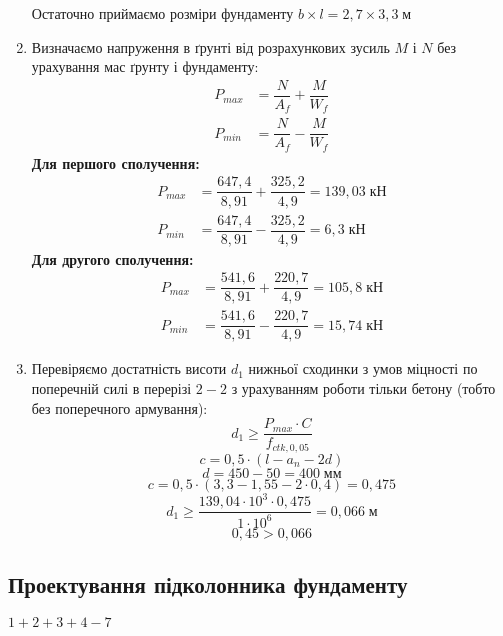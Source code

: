 \documentclass[a4paper,14pt]{article}
\begin{document}
\begin{enumerate}
\begin{equation*}
        \end{equation*}
    Остаточно приймаємо розміри фундаменту $b \times l = 2,7 \times 3,3\;\textit{м}$    
    \item Визначаємо напруження в ґрунті від розрахункових зусиль $M$ і $N$ без урахування мас ґрунту і фундаменту:
        \begin{equation}
        \begin{aligned}
            P_{max} &= \dfrac{N}{A_f} + \dfrac{M}{W_f}\\
            P_{min} &= \dfrac{N}{A_f} - \dfrac{M}{W_f}           
        \end{aligned}
        \end{equation}
        \textbf{Для першого сполучення:}
    \begin{equation*}
        \begin{aligned}
            P_{max} &= \dfrac{647,4}{8,91} + \dfrac{325,2}{4,9} = 139,03\;\textit{кН}\\
            P_{min} &= \dfrac{647,4}{8,91} - \dfrac{325,2}{4,9} = 6,3\;\textit{кН} 
        \end{aligned}
        \end{equation*}
    \textbf{Для другого сполучення:}
    \begin{equation*}
        \begin{aligned}
            P_{max} &= \dfrac{541,6}{8,91} + \dfrac{220,7}{4,9} = 105,8\;\textit{кН}\\
            P_{min} &= \dfrac{541,6}{8,91} - \dfrac{220,7}{4,9} = 15,74\;\textit{кН} 
        \end{aligned}
        \end{equation*}
    \item Перевіряємо достатність висоти $d_1$ нижньої сходинки з умов міцності по 
    поперечній силі в перерізі $2-2$ з урахуванням роботи тільки бетону (тобто без поперечного армування):
    \begin{equation}
        d_1 \geq \dfrac{P_{max} \cdot C}{f_{ctk,0,05}}
    \end{equation}
    \begin{equation}
        c=0,5 \cdot (l-a_n-2d)
    \end{equation}
    $$d = 450 - 50 = 400\;\textit{мм}$$
    $$c=0,5 \cdot (3,3 - 1,55 - 2 \cdot 0,4) = 0,475$$
    $$ d_1\geq \dfrac{139,04 \cdot 10^3 \cdot 0,475}{1 \cdot 10^6} = 0,066\;\textit{м}$$
    $$0,45 > 0,066$$
\end{enumerate} 
\subsection{Проектування підколонника фундаменту}
        $1 + 2 + 3 + 4 - 7$
     
\end{document}
